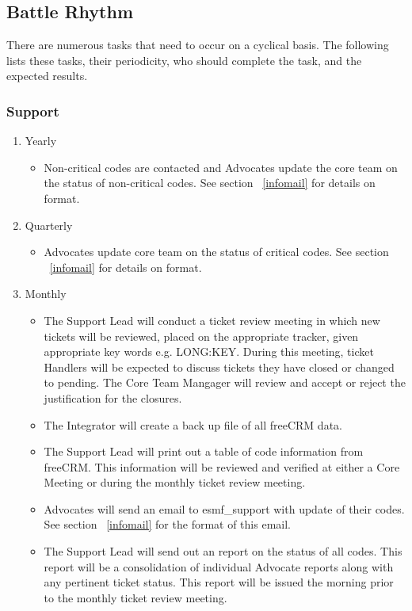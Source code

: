 \subsection{Battle Rhythm}
\label{battle}
There are numerous tasks that need to occur on a cyclical basis. The following lists these tasks, their periodicity, who should complete the task, and the expected results.

\subsubsection{Support}
\begin{enumerate}

\item Yearly
 \begin{itemize}
 \item Non-critical codes are contacted and Advocates update the core team on the status of non-critical codes. See section ~\ref{infomail} for details on format.
 \end{itemize}

\item Quarterly
 \begin{itemize}
 \item Advocates update core team on the status of critical codes. See section ~\ref{infomail} for details on format.
 \end{itemize}

\item Monthly
  \begin{itemize}
  \item The Support Lead will conduct a ticket review meeting in which new tickets will be reviewed, placed on the appropriate tracker, given appropriate key words e.g. LONG:KEY. During this meeting, ticket Handlers will be expected to discuss tickets they have closed or changed to pending. The Core Team Mangager will review and accept or reject the justification for the closures.
   \item The Integrator will create a back up file of all freeCRM data.
   \item The Support Lead will print out a table of code information from freeCRM. This information will be reviewed and verified at either a Core Meeting or during the monthly ticket review meeting. 
   \item Advocates will send an email to esmf\_support with update of their codes. See section ~\ref{infomail} for the format of this email.
   \item The Support Lead will send out an report on the status of all codes. This report will be a consolidation of individual Advocate reports along with any pertinent ticket status. This report will be issued the morning prior to the monthly ticket review meeting. 
  \end{itemize}


\end{enumerate}
